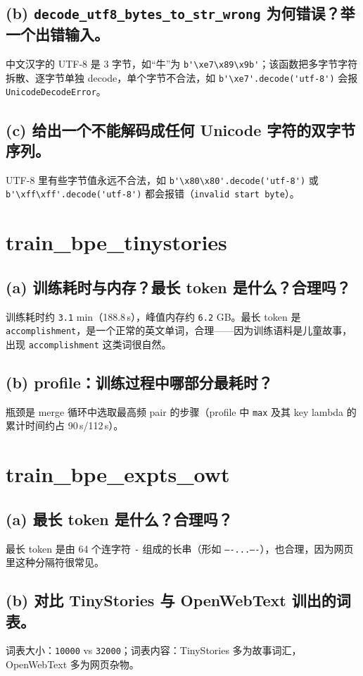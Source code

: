 \documentclass[12pt]{ctexart}
\begin{document}
\subsection{(b) \texttt{decode\_utf8\_bytes\_to\_str\_wrong} 为何错误？举一个出错输入。}
中文汉字的 UTF-8 是 3 字节，如“牛”为 \verb|b'\xe7\x89\x9b'|；该函数把多字节字符拆散、逐字节单独 decode，单个字节不合法，如 \verb|b'\xe7'.decode('utf-8')| 会报 \texttt{UnicodeDecodeError}。

\subsection{(c) 给出一个不能解码成任何 Unicode 字符的双字节序列。}
UTF-8 里有些字节值永远不合法，如 \verb|b'\x80\x80'.decode('utf-8')| 或 \verb|b'\xff\xff'.decode('utf-8')| 都会报错（\texttt{invalid start byte}）。

\section{train\_bpe\_tinystories}

\subsection{(a) 训练耗时与内存？最长 token 是什么？合理吗？}
训练耗时约 \texttt{3.1} min（188.8\,s），峰值内存约 \texttt{6.2} GB。最长 token 是 \verb| accomplishment|，是一个正常的英文单词，合理——因为训练语料是儿童故事，出现 \texttt{accomplishment} 这类词很自然。

\subsection{(b) profile：训练过程中哪部分最耗时？}
瓶颈是 merge 循环中选取最高频 pair 的步骤（profile 中 \texttt{max} 及其 key lambda 的累计时间约占 90\,s/112\,s）。

\section{train\_bpe\_expts\_owt}

\subsection{(a) 最长 token 是什么？合理吗？}
最长 token 是由 64 个连字符 \texttt{-} 组成的长串（形如 \texttt{----...----}），也合理，因为网页里这种分隔符很常见。

\subsection{(b) 对比 TinyStories 与 OpenWebText 训出的词表。}
词表大小：\texttt{10000} vs \texttt{32000}；词表内容：TinyStories 多为故事词汇，OpenWebText 多为网页杂物。
\end{document}
